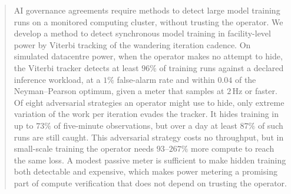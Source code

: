 \documentclass{article}
\begin{document}

\printAffiliationsAndNotice{}

\begin{abstract}
AI governance agreements require methods to detect large model training runs on a monitored computing cluster, without trusting the operator. We develop a method to detect synchronous model training in facility-level power by Viterbi tracking of the wandering iteration cadence. On simulated datacentre power, when the operator makes no attempt to hide, the Viterbi tracker detects at least $96\%$ of training runs against a declared inference workload, at a $1\%$ false-alarm rate and within $0.04$ of the Neyman--Pearson optimum, given a meter that samples at $2$\,Hz or faster. Of eight adversarial strategies an operator might use to hide, only extreme variation of the work
per iteration evades the tracker. It hides training in up to $73\%$ of five-minute
observations, but over a day at least $87\%$ of such runs are still caught. This adversarial
strategy costs no throughput, but in small-scale training the operator needs
$93$--$267\%$ more compute to reach the same loss. A modest passive meter is sufficient to make hidden training both detectable and expensive, which
makes power metering a promising part of compute verification that does not
depend on trusting the operator.








\end{abstract}
\end{document}
